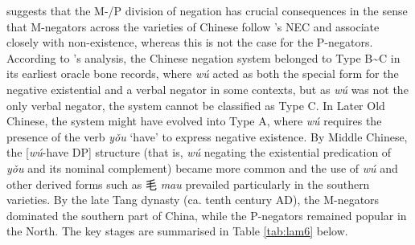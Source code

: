 \documentclass[output=paper]{langscibook}
\begin{document}
\citet{Zhang2002} suggests that the M-/P division of negation has crucial consequences in the sense that M-negators across the varieties of Chinese follow \citeauthor{Croft1991}'s NEC and associate closely with non-existence, whereas this is not the case for the P-negators. According to \citeauthor{Zhang2002}'s analysis, the Chinese negation system belonged to Type B\sim C in its earliest oracle bone records, where \textit{wú} acted as both the special form for the negative existential and a verbal negator in some contexts, but as \textit{wú} was not the only verbal negator, the system cannot be classified as Type C. In Later Old Chinese, the system might have evolved into Type A, where \textit{wú} requires the presence of the verb \textit{yǒu} `have' to express negative existence. By Middle Chinese, the [\textit{wú}-have DP] structure (that is, \textit{wú} negating the existential predication of \textit{yǒu} and its nominal complement) became more common and the use of \textit{wú} and other derived forms such as 毛 \textit{mau} prevailed particularly in the southern varieties. By the late Tang dynasty (ca. tenth century AD), the M-negators dominated the southern part of China, while the P-negators remained popular in the North. The key stages are summarised in Table \ref{tab:lam6} below.  
\end{document}
